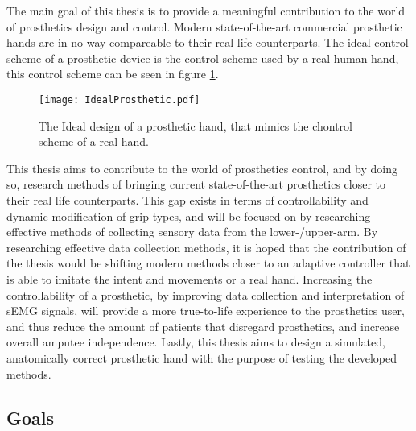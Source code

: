 \documentclass[../main.tex]{subfiles}
\begin{document}
The main goal of this thesis is to provide a meaningful contribution to the world of prosthetics design and control.
Modern state-of-the-art commercial prosthetic hands are in no way compareable to their real life counterparts.
The ideal control scheme of a prosthetic device is the control-scheme used by a real human hand, this control scheme can be seen in figure \ref{fig:idealprosthetic}.

\begin{figure}[h]
\begin{center}
\texttt{[image: IdealProsthetic.pdf]}
\caption{The Ideal design of a prosthetic hand, that mimics the chontrol scheme of a real hand.}
\label{fig:idealprosthetic}
\end{center}
\end{figure}


This thesis aims to contribute to the world of prosthetics control, and by doing so, research methods of bringing current state-of-the-art prosthetics closer to their real life counterparts.
This gap exists in terms of controllability and dynamic modification of grip types, and will be focused on by researching effective methods of collecting sensory data from the lower-/upper-arm.
By researching effective data collection methods, it is hoped that the contribution of the thesis would be shifting modern methods closer to an adaptive controller that is able to imitate the intent and movements or a real hand.
Increasing the controllability of a prosthetic, by improving data collection and interpretation of  sEMG signals, will provide a more true-to-life experience to the prosthetics user, and thus reduce the amount of patients that disregard prosthetics, and increase overall amputee independence.
Lastly, this thesis aims to design a simulated, anatomically correct prosthetic hand with the purpose of testing the developed methods.


\newpage
\subsection{Goals}
\end{document}
